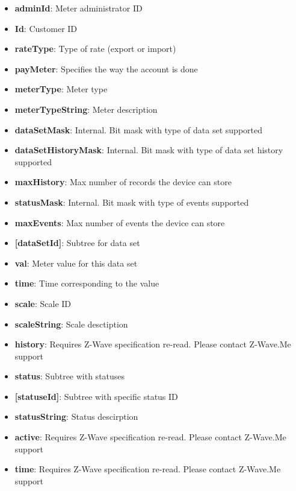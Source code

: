 \begin{itemize}
\item \textbf{adminId}: Meter administrator ID
\item \textbf{Id}: Customer ID
\item \textbf{rateType}: Type of rate (export or import)
\item \textbf{payMeter}: Specifies the way the account is done
\item \textbf{meterType}: Meter type
\item \textbf{meterTypeString}: Meter description
\item \textbf{dataSetMask}: Internal. Bit mask with type of data set supported
\item \textbf{dataSetHistoryMask}: Internal. Bit mask with type of data set history supported
\item \textbf{maxHistory}: Max number of records the device can store
\item \textbf{statusMask}: Internal. Bit mask with type of events supported
\item \textbf{maxEvents}: Max number of events the device can store
\item \textbf{[dataSetId]}: Subtree for data set
\item \qquad\textbf{val}: Meter value for this data set
\item \qquad\textbf{time}: Time corresponding to the value
\item \qquad\textbf{scale}: Scale ID
\item \qquad\textbf{scaleString}: Scale desctiption
\item \qquad\textbf{history}: Requires Z-Wave specification re-read. Please contact Z-Wave.Me support
\item \textbf{status}: Subtree with statuses
\item \qquad\textbf{[statuseId]}: Subtree with specific status ID
\item \qquad\qquad\textbf{statusString}: Status descirption
\item \qquad\qquad\textbf{active}: Requires Z-Wave specification re-read. Please contact Z-Wave.Me support
\item \qquad\qquad\textbf{time}: Requires Z-Wave specification re-read. Please contact Z-Wave.Me support
\end{itemize}

